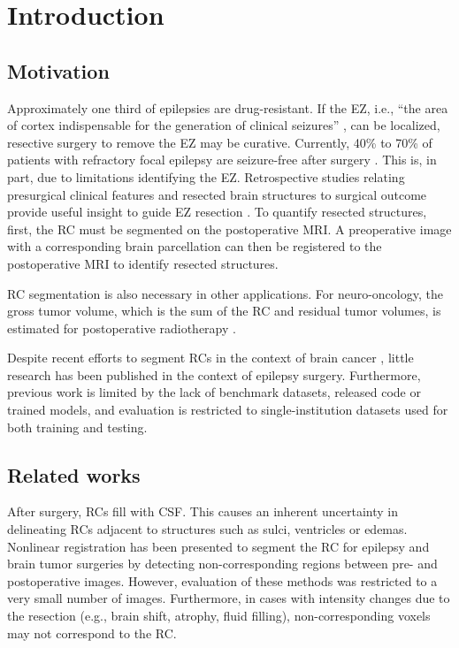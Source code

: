 \section{Introduction}

\subsection{Motivation}

Approximately one third of epilepsies are drug-resistant.
If the \ac{EZ}, i.e., ``the area of cortex indispensable for the generation of clinical seizures'' \cite{rosenow_presurgical_2001}, can be localized, resective surgery to remove the \ac{EZ} may be curative.
Currently, 40\% to 70\% of patients with refractory focal epilepsy are seizure-free after surgery \cite{jobst_resective_2015}.
This is, in part, due to limitations identifying the \ac{EZ}.
Retrospective studies relating presurgical clinical features and resected brain structures to surgical outcome provide useful insight to guide \ac{EZ} resection \cite{jobst_resective_2015}.
To quantify resected structures, first, the \ac{RC} must be segmented on the postoperative \ac{MRI}.
A preoperative image with a corresponding brain parcellation can then be registered to the postoperative \ac{MRI} to identify resected structures.

\Ac{RC} segmentation is also necessary in other applications.
For neuro-oncology, the gross tumor volume, which is the sum of the \ac{RC} and residual tumor volumes, is estimated for postoperative radiotherapy \cite{ermis_fully_2020}.

Despite recent efforts to segment \acp{RC} in the context of brain cancer \cite{meier_automatic_2017,ermis_fully_2020}, little research has been published in the context of epilepsy surgery.
Furthermore, previous work is limited by the lack of benchmark datasets, released code or trained models, and evaluation is restricted to single-institution datasets used for both training and testing.


\subsection{Related works}

After surgery, \acp{RC} fill with \ac{CSF}.
This causes an inherent uncertainty in delineating \acp{RC} adjacent to structures such as sulci, ventricles or edemas.
Nonlinear registration has been presented to segment the \ac{RC} for epilepsy \cite{chitphakdithai_non-rigid_2010} and brain tumor \cite{chen_deformable_2015} surgeries by detecting non-corresponding regions between pre- and postoperative images.
However, evaluation of these methods was restricted to a very small number of images.
Furthermore, in cases with intensity changes due to the resection (e.g., brain shift, atrophy, fluid filling), non-corresponding voxels may not correspond to the \ac{RC}.

